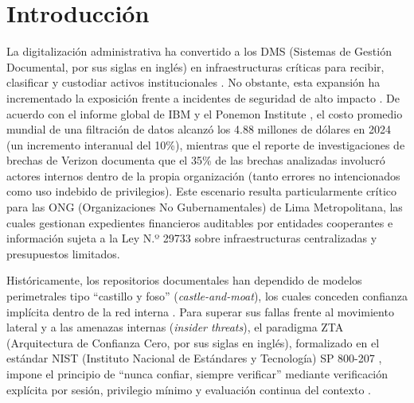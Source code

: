 \documentclass[runningheads,twocolumn]{llncs}
\begin{document}
\section{Introducción}\label{sec:intro}

La digitalización administrativa ha convertido a los DMS (Sistemas de Gestión Documental, por sus siglas en inglés) en infraestructuras críticas para recibir, clasificar y custodiar activos institucionales \cite{han2025,satybaldy2022}. No obstante, esta expansión ha incrementado la exposición frente a incidentes de seguridad de alto impacto \cite{swapna2026}. De acuerdo con el informe global de IBM y el Ponemon Institute \cite{ibm2024}, el costo promedio mundial de una filtración de datos alcanzó los 4.88 millones de dólares en 2024 (un incremento interanual del 10\%), mientras que el reporte de investigaciones de brechas de Verizon \cite{verizon2024} documenta que el 35\% de las brechas analizadas involucró actores internos dentro de la propia organización (tanto errores no intencionados como uso indebido de privilegios). Este escenario resulta particularmente crítico para las ONG (Organizaciones No Gubernamentales) de Lima Metropolitana, las cuales gestionan expedientes financieros auditables por entidades cooperantes e información sujeta a la Ley N.º 29733 \cite{ley29733} sobre infraestructuras centralizadas y presupuestos limitados.

Históricamente, los repositorios documentales han dependido de modelos perimetrales tipo ``castillo y foso'' (\textit{castle-and-moat}), los cuales conceden confianza implícita dentro de la red interna \cite{soni2026,nam2026}. Para superar sus fallas frente al movimiento lateral y a las amenazas internas (\textit{insider threats}), el paradigma ZTA (Arquitectura de Confianza Cero, por sus siglas en inglés), formalizado en el estándar NIST (Instituto Nacional de Estándares y Tecnología) SP 800-207 \cite{rose2020}, impone el principio de ``nunca confiar, siempre verificar'' mediante verificación explícita por sesión, privilegio mínimo y evaluación continua del contexto \cite{nam2026,sammartino2026,alenezi2026}.
\end{document}
